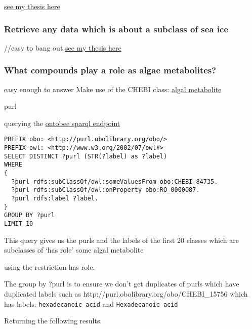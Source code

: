 \documentclass[]{article}
\newcommand{\passthrough}[1]{#1}
\begin{document}
\href{https://github.com/kaiiam/kblumberg_masters_thesis/wiki/thesis-pieces\#lookup-author-of-ontology-term}{see
my thesis here}

\hypertarget{retrieve-any-data-which-is-about-a-subclass-of-sea-ice}{%
\subsubsection{Retrieve any data which is about a subclass of sea
ice}\label{retrieve-any-data-which-is-about-a-subclass-of-sea-ice}}

//easy to bang out
\href{https://github.com/kaiiam/kblumberg_masters_thesis/wiki/thesis-pieces\#retrieve-any-data-which-is-about-a-subclass-of-sea-ice}{see
my thesis here}

\hypertarget{what-compounds-play-a-role-as-algae-metabolites}{%
\subsubsection{What compounds play a role as algae
metabolites?}\label{what-compounds-play-a-role-as-algae-metabolites}}

easy enough to answer Make use of the CHEBI class:
\href{http://purl.obolibrary.org/obo/CHEBI_84735}{algal metabolite}

purl

querying the \href{http://www.ontobee.org/sparql}{ontobee sparql
endpoint}

\begin{lstlisting}
PREFIX obo: <http://purl.obolibrary.org/obo/>
PREFIX owl: <http://www.w3.org/2002/07/owl#>
SELECT DISTINCT ?purl (STR(?label) as ?label)
WHERE
{
  ?purl rdfs:subClassOf/owl:someValuesFrom obo:CHEBI_84735.
  ?purl rdfs:subClassOf/owl:onProperty obo:RO_0000087.
  ?purl rdfs:label ?label.
}
GROUP BY ?purl
LIMIT 10
\end{lstlisting}

This query gives us the purls and the labels of the first 20 classes
which are subclasses of `has role' some algal metabolite

using the restriction has role.

The group by ?purl is to ensure we don't get duplicates of purls which
have duplicated labels such as
http://purl.obolibrary.org/obo/CHEBI\_15756 which has labels:
\passthrough{\lstinline!hexadecanoic acid!} and
\passthrough{\lstinline!Hexadecanoic acid!}

Returning the following results:
\end{document}
